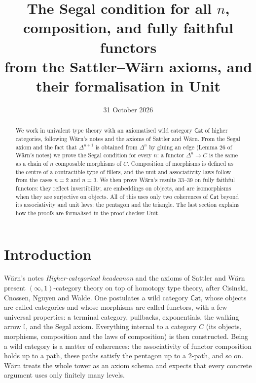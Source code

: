 \documentclass[11pt]{amsart}
\title[The Segal condition and fully faithful functors]{The Segal condition
for all $n$, composition, and fully faithful functors\\ from the
Sattler--W\"arn axioms, and their formalisation in Unit}
\date{31 October 2026}
\numberwithin{equation}{section}
\theoremstyle{definition}
\theoremstyle{remark}
\newcommand{\Cat}{\mathsf{Cat}}
\newcommand{\II}{\mathbb{I}}
\begin{document}
\sloppy
\begin{abstract}
We work in univalent type theory with an axiomatised wild category
$\Cat$ of higher categories, following W\"arn's notes and the axioms of
Sattler and W\"arn. From the Segal axiom and the fact that $\Delta^{n+1}$
is obtained from $\Delta^n$ by gluing an edge (Lemma 26 of W\"arn's
notes) we prove the Segal condition for every $n$: a functor
$\Delta^n\to C$ is the same as a chain of $n$ composable morphisms of
$C$. Composition of morphisms is defined as the centre of a contractible
type of fillers, and the unit and associativity laws follow from the
cases $n=2$ and $n=3$. We then prove W\"arn's results 33--39 on fully
faithful functors: they reflect invertibility, are embeddings on
objects, and are isomorphisms when they are surjective on objects. All
of this uses only two coherences of $\Cat$ beyond its associativity and
unit laws: the pentagon and the triangle. The last section explains
how the proofs are formalised in the proof checker Unit.
\end{abstract}
\maketitle

\section{Introduction}

W\"arn's notes \emph{Higher-categorical headcanon} and the axioms of
Sattler and W\"arn present $(\infty,1)$-category theory on top of
homotopy type theory, after Cisinski, Cnossen, Nguyen and Walde. One
postulates a wild category $\Cat$, whose objects are called categories
and whose morphisms are called functors, with a few universal
properties: a terminal category, pullbacks, exponentials, the walking
arrow $\II$, and the Segal axiom. Everything internal to a category
$C$ (its objects, morphisms, composition and the laws of composition)
is then constructed. Being a wild category is a matter of coherences:
the associativity of functor composition holds up to a path, these
paths satisfy the pentagon up to a 2-path, and so on. W\"arn treats the
whole tower as an axiom schema and expects that every concrete argument
uses only finitely many levels.
\end{document}
